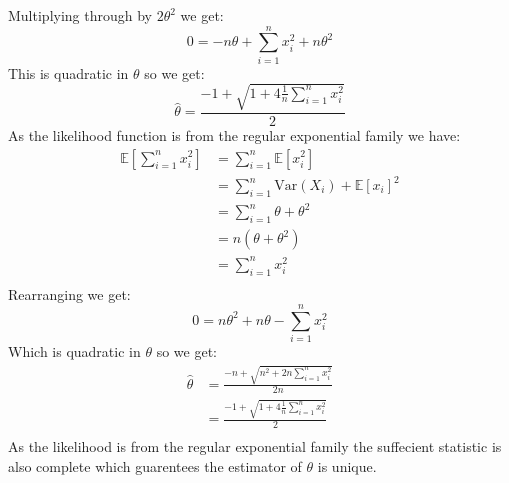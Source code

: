 \documentclass{article}
\begin{document}
Multiplying through by $2\theta^2$ we get:
$$0=-n\theta+\sum_{i=1}^{n}x_i^2+n\theta^2$$
This is quadratic in $\theta$ so we get:
$$\hat{\theta}=\frac{-1+\sqrt{1+4\frac{1}{n}\sum_{i=1}^nx_i^2}}{2}$$
As the likelihood function is from the regular exponential family we have:
\begin{align*}
\mathbb{E}\left[\sum_{i=1}^nx_i^2\right]&=\sum_{i=1}^n\mathbb{E}\left[x_i^2\right]\\
&=\sum_{i=1}^n\text{Var}(X_i)+\mathbb{E}\left[x_i\right]^2\\
&=\sum_{i=1}^n\theta+\theta^2\\
&=n(\theta+\theta^2)\\
&=\sum_{i=1}^nx_i^2\\
\end{align*}
Rearranging we get:
$$0=n\theta^2+n\theta-\sum_{i=1}^nx_i^2$$
Which is quadratic in $\theta$ so we get:
\begin{align*}
\hat{\theta}&=\frac{-n+\sqrt{n^2+2n\sum_{i=1}^nx_i^2}}{2n}\\
&=\frac{-1+\sqrt{1+4\frac{1}{n}\sum_{i=1}^nx_i^2}}{2}\\
\end{align*}
As the likelihood is from the regular exponential family the suffecient statistic is also complete which guarentees the estimator of $\theta$ is unique. 
\end{document}
